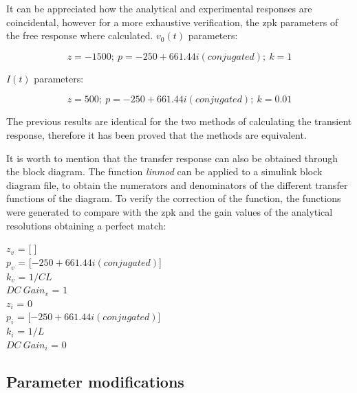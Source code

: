 \documentclass[a4paper,12pt]{article}
\begin{document}
It can  be appreciated how the analytical and experimental responses are coincidental, however for a more exhaustive verification, the zpk parameters of the free response where calculated. $v_0(t)$ parameters:

\vspace{0.5cm}

\[z = -1500;\ p = -250 + 661.44i (conjugated); \ k = 1\]

\vspace{0.5cm}

$I(t)$ parameters:

\[z = 500;\ p = -250 + 661.44i (conjugated); \ k = 0.01\]

\vspace{0,5cm}

The previous results are identical for the two methods of calculating the transient response, therefore it has been proved that the methods are equivalent. 

\vspace{0.5cm}

It is worth to mention that the transfer response can also be obtained through the block diagram. The function \textit{linmod} can be applied to a simulink block diagram file, to obtain the numerators and denominators of the different transfer functions of the diagram. To verify the correction of the function, the functions were generated to compare with the zpk and the gain values of the analytical resolutions obtaining a perfect match:

\vspace{0.5cm}

{\centering
$z_v$ = [ ] \\ 
$p_v$ = [$-250 + 661.44i (conjugated)$] \\
$k_v$ = $1/CL$\\
$DC\ Gain_v$ = $1$\\
$z_i$ = $0$ \\
$p_i$ = [$-250 + 661.44i (conjugated)$] \\
$k_i$ = $1/L$\\
$DC\ Gain_i$ = $0$\\
}

\vspace{0.5cm}

\subsection{Parameter modifications}

\vspace{0.5cm}
\end{document}
